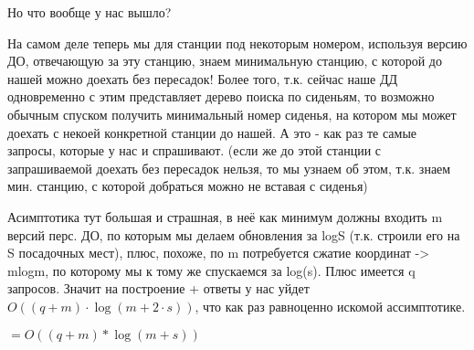 \documentclass{article}
\begin{document}
Но что вообще у нас вышло?

На самом деле теперь мы для станции под некоторым номером, используя версию ДО, отвечающую за эту станцию, знаем минимальную станцию, с которой до нашей можно доехать без пересадок! Более того, т.к. сейчас наше ДД одновременно с этим представляет дерево поиска по сиденьям, то возможно обычным спуском получить минимальный номер сиденья, на котором мы может доехать с некоей конкретной станции до нашей. А это - как раз те самые запросы, которые у нас и спрашивают. (если же до этой станции с запрашиваемой доехать без пересадок нельзя, то мы узнаем об этом, т.к. знаем мин. станцию, с которой добраться можно не вставая с сиденья)

Асимптотика тут большая и страшная, в неё как минимум должны входить m версий перс. ДО, по которым мы делаем обновления за logS (т.к. строили его на S посадочных мест), плюс, похоже, по m потребуется сжатие координат -> mlogm, по которому мы к тому же спускаемся за log(s). Плюс имеется q запросов. Значит на построение + ответы у нас уйдет $O\left( (q + m) \cdot \log (m + 2 \cdot s) \right)$, что как раз равноценно искомой ассимптотике.

$= O\left( (q + m) * \log (m + s) \right)$
\end{document}
